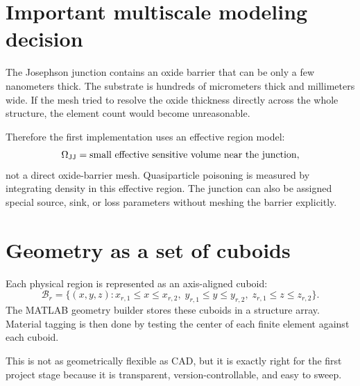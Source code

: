 \documentclass[11pt]{article}
\begin{document}
\section{Important multiscale modeling decision}
The Josephson junction contains an oxide barrier that can be only a few nanometers thick. The substrate is hundreds of micrometers thick and millimeters wide. If the mesh tried to resolve the oxide thickness directly across the whole structure, the element count would become unreasonable.

Therefore the first implementation uses an effective region model:
\begin{equation}
\Omega_{\mathrm{JJ}}=\text{small effective sensitive volume near the junction},
\end{equation}
not a direct oxide-barrier mesh. Quasiparticle poisoning is measured by integrating density in this effective region. The junction can also be assigned special source, sink, or loss parameters without meshing the barrier explicitly.

\section{Geometry as a set of cuboids}
Each physical region is represented as an axis-aligned cuboid:
\begin{equation}
\mathcal{B}_r=\{(x,y,z):x_{r,1}\le x\le x_{r,2},\;y_{r,1}\le y\le y_{r,2},\;z_{r,1}\le z\le z_{r,2}\}.
\end{equation}
The MATLAB geometry builder stores these cuboids in a structure array. Material tagging is then done by testing the center of each finite element against each cuboid.

This is not as geometrically flexible as CAD, but it is exactly right for the first project stage because it is transparent, version-controllable, and easy to sweep.
\end{document}
